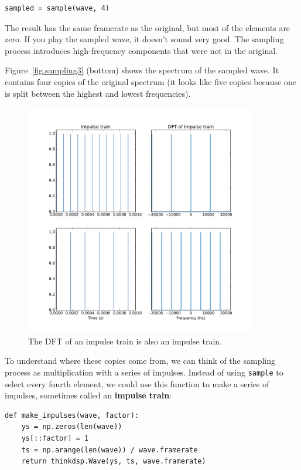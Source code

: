 \documentclass[12pt]{book}
\begin{document}
\begin{verbatim}
sampled = sample(wave, 4)
\end{verbatim}

The result has the same framerate as  the original, but most of the
elements are zero.  If you play the sampled wave, it doesn't sound
very good.  The sampling process introduces high-frequency
components that were not in the original.

Figure~\ref{fig.sampling3} (bottom) shows the spectrum of the sampled
wave.  It contains four copies of the original spectrum (it looks like
five copies because one is split between the highest and lowest
frequencies).

\begin{figure}
\centerline{\includegraphics[height=4in]{figs/sampling9.pdf}}
\caption{The DFT of an impulse train is also an impulse train.}
\label{fig.sampling9}
\end{figure}

To understand where these copies come from, we can think of the
sampling process as multiplication with a series of impulses.  Instead
of using {\tt sample} to select every fourth element, we could use
this function to make a series of impulses, sometimes called an
{\bf impulse train}:

\begin{verbatim}
def make_impulses(wave, factor):
    ys = np.zeros(len(wave))
    ys[::factor] = 1
    ts = np.arange(len(wave)) / wave.framerate
    return thinkdsp.Wave(ys, ts, wave.framerate)
\end{verbatim}
\end{document}
